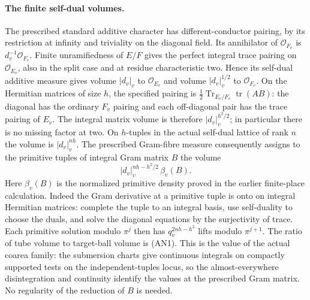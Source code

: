 \paragraph{The finite self-dual volumes.}
The prescribed standard additive character has different-conductor
pairing, by its restriction at infinity and triviality on the
diagonal field. Its annihilator of \(\mathcal O_{F_v}\) is
\(d_v^{-1}\mathcal O_{F_v}\). Finite unramifiedness of \(E/F\) gives the
perfect integral trace pairing on \(\mathcal O_{E_v}\), also in the
split case and at residue characteristic two. Hence its self-dual
additive measure gives volume \(|d_v|_v\) to \(\mathcal O_{E_v}\) and
volume \(|d_v|_v^{1/2}\) to \(\mathcal O_{F_v}\). On the Hermitian
matrices of size \(h\), the specified pairing is
\(\frac12\operatorname{Tr}_{E_v/F_v}\operatorname{tr}(AB)\):
the diagonal has the ordinary \(F_v\) pairing and each off-diagonal
pair has the trace pairing of \(E_v\). The integral matrix volume
is therefore \(|d_v|_v^{h^2/2}\); in particular there is no missing
factor at two. On \(h\)-tuples in the actual self-dual lattice of
rank \(n\) the volume is \(|d_v|_v^{nh}\). The prescribed Gram-fibre
measure consequently assigns to the primitive tuples of integral
Gram matrix \(B\) the volume
\[
          |d_v|_v^{nh-h^2/2}\,\beta_v(B).                 \tag{AN1}
\]
Here \(\beta_v(B)\) is the normalized primitive density proved in the
earlier finite-place calculation. Indeed the Gram derivative at
a primitive tuple is onto on integral Hermitian matrices:
complete the tuple to an integral basis, use self-duality to choose
the duals, and solve the diagonal equations by the surjectivity
of trace. Each primitive solution modulo \(\pi^j\) then has
\(q_v^{2nh-h^2}\) lifts modulo \(\pi^{j+1}\).
The ratio of tube volume to target-ball volume is (AN1). This is
the value of the actual coarea family: the submersion charts give
continuous integrals on compactly supported tests on the
independent-tuples locus, so the almost-everywhere disintegration
and continuity identify the values at the prescribed Gram matrix.
No regularity of the reduction of \(B\) is needed.

